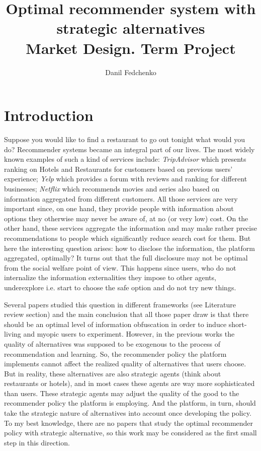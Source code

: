 \documentclass[a4paper]{article}
\title{Optimal recommender system with strategic alternatives \\ Market Design. Term Project}
\date{}
\author{Danil Fedchenko}
\begin{document}
	\maketitle
	\section{Introduction}
	Suppose you would like to find a restaurant to go out tonight what would you do? 
	Recommender systems became an integral part of our lives. The most widely known examples of such a kind of services include: \textit{TripAdvisor} which presents ranking on Hotels and Restaurants for customers based on previous users' experience; \textit{Yelp} which provides a forum with reviews and ranking for different businesses; \textit{Netflix} which recommends movies and series also based on information aggregated from different customers. All those services are very important since, on one hand, they provide people with information about options they otherwise may never be aware of, at no (or very low) cost. On the other hand, these services aggregate the information and may make rather precise recommendations to people which significantly reduce search cost for them. But here the interesting question arises: how to disclose the information, the platform aggregated, optimally? It turns out that the full disclosure may not be optimal from the social welfare point of view. This happens since users, who do not internalize the information externalities they impose to other agents, underexplore i.e. start to choose the safe option and do not try new things. 
	
	
	Several papers studied this question in different frameworks (see Literature review section) and the main conclusion that all those paper draw is that there should be an optimal level of information obfuscation in order to induce short-living and myopic users to experiment. However, in the previous works the quality of alternatives was supposed to be exogenous to the process of recommendation and learning. So, the recommender policy the platform implements cannot affect the realized quality of alternatives that users choose. But in reality, these alternatives are also strategic agents (think about restaurants or hotels), and in most cases these agents are way more sophisticated than users. These strategic agents may adjust the quality of the good to the recommender policy the platform is employing. And the platform, in turn, should take the strategic nature of alternatives into account once developing the policy. To my best knowledge, there are no papers that study the optimal recommender policy with strategic alternative, so this work may be considered as the first small step in this direction.
	
\end{document}
